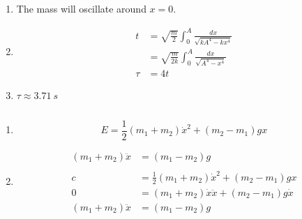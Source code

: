\documentclass{article}
\begin{document}
\setcounter{subsection}{28}
\subsection{}

\begin{enumerate}
  \item The mass will oscillate around $x = 0$.

  \item

        \begin{align*}
          t    & = \sqrt{\frac{m}{2}} \int_0^A \frac{d x}{\sqrt{k A^4 - k x^4}} \\
               & = \sqrt{\frac{m}{2 k}} \int_0^A \frac{d x}{\sqrt{A^4 - x^4}}   \\
          \tau & = 4 t
        \end{align*}

        \setcounter{enumi}{3}
  \item $\tau \approx \qty{3.71}{s}$
\end{enumerate}

\setcounter{subsection}{30}
\subsection{}

\begin{enumerate}
  \item \[E = \frac{1}{2} (m_1 + m_2) \dot{x}^2 + (m_2 - m_1) g x\]

  \item

        \begin{align*}
          (m_1 + m_2) \ddot{x} & = (m_1 - m_2) g                                        \\ \\
          c                    & = \frac{1}{2} (m_1 + m_2) \dot{x}^2 + (m_2 - m_1) g x  \\
          0                    & = (m_1 + m_2) \dot{x} \ddot{x} + (m_2 - m_1) g \dot{x} \\
          (m_1 + m_2) \ddot{x} & = (m_1 - m_2) g
        \end{align*}
\end{enumerate}

\setcounter{subsection}{34}
\subsection{}
\end{document}

